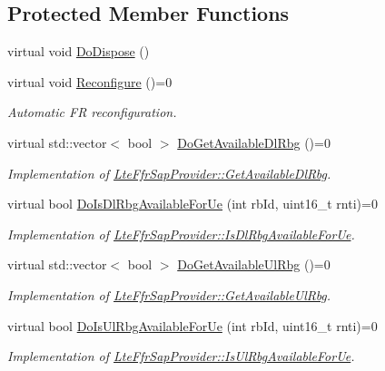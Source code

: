 \subsection*{Protected Member Functions}
\begin{DoxyCompactItemize}
\item 
virtual void \hyperlink{classns3_1_1LteFfrAlgorithm_a518ca5c63e35cd61757775915439beee}{Do\+Dispose} ()
\item 
virtual void \hyperlink{classns3_1_1LteFfrAlgorithm_a692040d8f3deb749d48dc74440709f79}{Reconfigure} ()=0
\begin{DoxyCompactList}\small\item\em Automatic FR reconfiguration. \end{DoxyCompactList}\item 
virtual std\+::vector$<$ bool $>$ \hyperlink{classns3_1_1LteFfrAlgorithm_abf37d51075140906343c884ffc954f0c}{Do\+Get\+Available\+Dl\+Rbg} ()=0
\begin{DoxyCompactList}\small\item\em Implementation of \hyperlink{classns3_1_1LteFfrSapProvider_ad60306dae43b74dc25b65f81d6587a24}{Lte\+Ffr\+Sap\+Provider\+::\+Get\+Available\+Dl\+Rbg}. \end{DoxyCompactList}\item 
virtual bool \hyperlink{classns3_1_1LteFfrAlgorithm_a1b7c1917fe5fbe7584900203cf76f006}{Do\+Is\+Dl\+Rbg\+Available\+For\+Ue} (int rb\+Id, uint16\+\_\+t rnti)=0
\begin{DoxyCompactList}\small\item\em Implementation of \hyperlink{classns3_1_1LteFfrSapProvider_a91f4de3c794d2a32fae5bcfafd88b6fa}{Lte\+Ffr\+Sap\+Provider\+::\+Is\+Dl\+Rbg\+Available\+For\+Ue}. \end{DoxyCompactList}\item 
virtual std\+::vector$<$ bool $>$ \hyperlink{classns3_1_1LteFfrAlgorithm_a0495feedc956dbb0b4283846efb66d70}{Do\+Get\+Available\+Ul\+Rbg} ()=0
\begin{DoxyCompactList}\small\item\em Implementation of \hyperlink{classns3_1_1LteFfrSapProvider_aafd23b22a27ec83e03d54795c122d175}{Lte\+Ffr\+Sap\+Provider\+::\+Get\+Available\+Ul\+Rbg}. \end{DoxyCompactList}\item 
virtual bool \hyperlink{classns3_1_1LteFfrAlgorithm_a0c2c54224720e5bbb8c6d05413e6bb63}{Do\+Is\+Ul\+Rbg\+Available\+For\+Ue} (int rb\+Id, uint16\+\_\+t rnti)=0
\begin{DoxyCompactList}\small\item\em Implementation of \hyperlink{classns3_1_1LteFfrSapProvider_a3ef80840549b8ea3d50d2cef8a9866e2}{Lte\+Ffr\+Sap\+Provider\+::\+Is\+Ul\+Rbg\+Available\+For\+Ue}. \end{DoxyCompactList}\item 

\end{DoxyCompactItemize}
